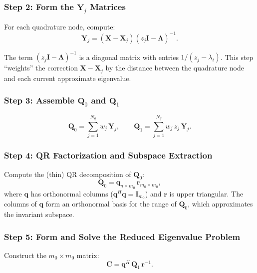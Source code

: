 \documentclass[12pt,a4paper]{article}
\theoremstyle{definition}
\begin{document}
\subsubsection*{Step 2: Form the $\mathbf{Y}_j$ Matrices}

For each quadrature node, compute:
\begin{equation}\label{eq:Yj}
\mathbf{Y}_j = (\mathbf{X} - \mathbf{X}_j)(z_j\mathbf{I} - \mathbf{\Lambda})^{-1}.
\end{equation}

The term $(z_j\mathbf{I} - \mathbf{\Lambda})^{-1}$ is a diagonal matrix with entries $1/(z_j - \lambda_i)$. This step ``weights'' the correction $\mathbf{X} - \mathbf{X}_j$ by the distance between the quadrature node and each current approximate eigenvalue.

\subsubsection*{Step 3: Assemble $\mathbf{Q}_0$ and $\mathbf{Q}_1$}

\begin{equation}\label{eq:Q0Q1}
\mathbf{Q}_0 = \sum_{j=1}^{N_q} w_j\,\mathbf{Y}_j, \qquad
\mathbf{Q}_1 = \sum_{j=1}^{N_q} w_j\,z_j\,\mathbf{Y}_j.
\end{equation}

\subsubsection*{Step 4: QR Factorization and Subspace Extraction}

Compute the (thin) QR decomposition of $\mathbf{Q}_0$:
\begin{equation}\label{eq:QR}
\mathbf{Q}_0 = \mathbf{q}_{n \times m_0}\,\mathbf{r}_{m_0 \times m_0},
\end{equation}
where $\mathbf{q}$ has orthonormal columns ($\mathbf{q}^{H}\mathbf{q} = \mathbf{I}_{m_0}$) and $\mathbf{r}$ is upper triangular. The columns of $\mathbf{q}$ form an orthonormal basis for the range of $\mathbf{Q}_0$, which approximates the invariant subspace.

\subsubsection*{Step 5: Form and Solve the Reduced Eigenvalue Problem}

Construct the $m_0 \times m_0$ matrix:
\begin{equation}\label{eq:C_matrix}
\mathbf{C} = \mathbf{q}^{H}\,\mathbf{Q}_1\,\mathbf{r}^{-1}.
\end{equation}
\end{document}
